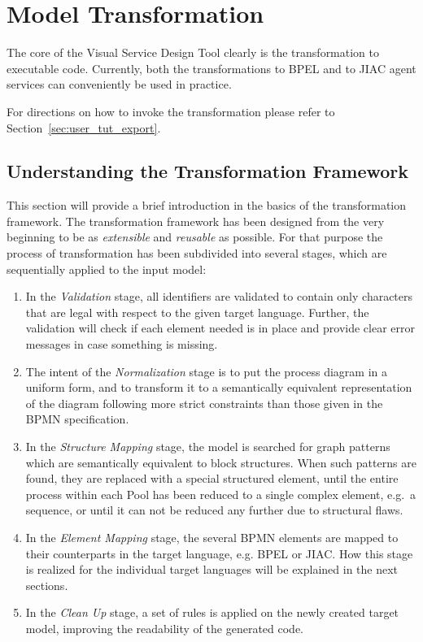 \chapter{Model Transformation}
\label{sec:user_trafo}

The core of the Visual Service Design Tool clearly is the transformation to
executable code.  Currently, both the transformations to BPEL and to JIAC agent
services can conveniently be used in practice.

For directions on how to invoke the transformation please refer to
Section~\ref{sec:user_tut_export}.



\section{Understanding the Transformation Framework}

This section will provide a brief introduction in the basics of the transformation
framework.  The transformation framework has been designed from the very beginning
to be as \emph{extensible} and \emph{reusable} as possible.  For that purpose the
process of transformation has been subdivided into several stages, which are
sequentially applied to the input model:
\begin{enumerate}
	\item In the \emph{Validation} stage, all identifiers are validated to contain
	only characters that are legal with respect to the given target language.
	Further, the validation will check if each element needed is in place and
	provide clear error messages in case something is missing.
	
	\item The intent of the \emph{Normalization} stage is to put the process
	diagram in a uniform form, and to transform it to a semantically equivalent
	representation of the diagram following more strict constraints than those
	given in the BPMN specification.
	
	\item In the \emph{Structure Mapping} stage, the model is searched for graph
	patterns which are semantically equivalent to block structures.  When such
	patterns are found, they are replaced with a special structured element, until
	the entire process within each Pool has been reduced to a single complex
	element, e.g.\ a sequence, or until it can not be reduced any further due to
	structural flaws.
	
	\item In the \emph{Element Mapping} stage, the several BPMN elements are
	mapped to their counterparts in the target language, e.g. BPEL or JIAC. How
	this stage is realized for the individual target languages will be explained
	in the next sections.
	
	\item In the \emph{Clean Up} stage, a set of rules is applied on the newly
	created target model, improving the readability of the generated code.
\end{enumerate}

